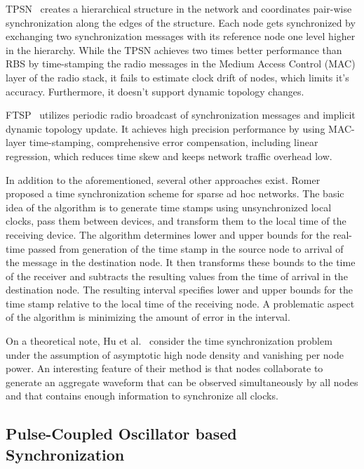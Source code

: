 \documentclass[8pt,twocolumn]{article}
\begin{document}
TPSN~\cite{tpsn03} creates a hierarchical structure in the network and
coordinates pair-wise synchronization along the edges of the structure.  Each
node gets synchronized by exchanging two synchronization messages with its
reference node one level higher in the hierarchy. While the TPSN achieves two
times better performance than RBS by time-stamping the radio messages in the
Medium Access Control (MAC) layer of the radio stack, it fails to estimate
clock drift of nodes, which limits it's accuracy. Furthermore, it doesn't
support dynamic topology changes.

FTSP~\cite{ftsp04} utilizes periodic radio broadcast of synchronization
messages and implicit dynamic topology update. It achieves high precision
performance by using MAC-layer time-stamping, comprehensive error
compensation, including linear regression, which reduces time skew and keeps
network traffic overhead low.

In addition to the aforementioned, several other approaches exist.
Romer~\cite{tsan01} proposed a time synchronization scheme for sparse ad hoc
networks.  The basic idea of the algorithm is to generate time stamps using
unsynchronized local clocks, pass them between devices, and transform them to
the local time of the receiving device. The algorithm determines lower and
upper bounds for the real-time passed from generation of the time stamp in
the source node to arrival of the message in the destination node. It then
transforms these bounds to the time of the receiver and subtracts the
resulting values from the time of arrival in the destination node.  The
resulting interval specifies lower and upper bounds for the time stamp
relative to the local time of the receiving node.  A problematic aspect of
the algorithm is minimizing the amount of error in the interval.

On a theoretical note, Hu et al.~\cite{aots03} consider the time
synchronization problem under the assumption of asymptotic high node density
and vanishing per node power.  An interesting feature of their method is that
nodes collaborate to generate an aggregate waveform that can be observed
simultaneously by all nodes and that contains enough information to
synchronize all clocks.

\subsection{Pulse-Coupled Oscillator based Synchronization}
\end{document}
